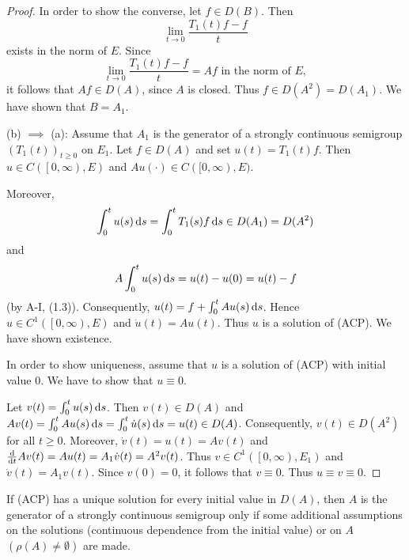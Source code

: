 \begin{proof}
In order to show the converse, let $f \in D(B)$.
Then 
\[ 
\lim_{t \to 0} \frac{T_{1}(t)f - f}{t}
\]
exists in the norm of $E$.
Since  
\[ 
\lim_{t \to 0} \frac{T_{1}(t)f - f}{t} = Af \text{ in the norm of } E,
\]
it follows that $Af \in D(A)$, since $A$ is closed.
Thus $f \in D(A^{2}) = D(A_{1})$.
We have shown that $B = A_{1}$.

(b)  $\implies$ (a):  
Assume that $A_{1}$ is the generator of a strongly continuous semigroup $(T_{1}(t))_{t \geq 0}$ on $E_{1}$.
Let $f \in D(A)$ and set $u(t) = T_{1}(t)f$.
Then $u \in C(\left[0,\infty\right),E)$ and $Au(\cdot) \in C([0,\infty),E)$.

Moreover, 
\[
\int_{0}^{t} u(s) \mathop{}\!\mathrm{d}{s} = \int_{0}^{t} T_{1}(s) f   \mathop{}\!\mathrm{d}{s} \in D(A_{1}) = D(A^{2})
\]
and 
\[
A\int_{0}^{t} u(s) \mathop{}\!\mathrm{d}{s} = u(t) - u(0) = u(t) - f
\]
(by A-I, (1.3)).
Consequently, $u(t) = f + \int_{0}^{t} Au(s) \mathop{}\!\mathrm{d}{s}$.
Hence $u \in C^{1}(\left[0,\infty  \right),E)$ and $\dot{u}(t) = Au(t)$.
Thus $u$ is a solution of (ACP).
We have shown existence.

In order to show uniqueness, assume that $u$ is a solution of (ACP) with initial value $0$.
We have to show that $u \equiv 0$.

Let $v(t) = \int_{0}^{t} u(s) \mathop{}\!\mathrm{d}{s}$.
Then $v(t) \in D(A)$ and $Av(t) = \int_{0}^{t} Au(s) \mathop{}\!\mathrm{d}{s} =
 \int_{0}^{t} \dot{u}(s) \mathop{}\!\mathrm{d}{s} = 
 u(t) \in D(A)$.
Consequently, $v(t) \in D(A^{2})$ for all $t \geq 0$.
Moreover, $\dot{v}(t) = u(t) = Av(t)$ and 
$\frac{\mathop{}\!\mathrm{d}{}}{\mathop{}\!\mathrm{d}{t}}Av(t) = Au(t) = A_{1}\dot{v}(t) = A^{2}v(t)$.
Thus $v \in C^{1}(\left[0,\infty \right),E_{1})$ and $\dot{v}(t) = A_{1}v(t)$.
Since $v(0) = 0$, it follows that $v \equiv 0$.
Thus $u \equiv v  \equiv 0$.
\end{proof}
If (ACP) has a unique solution for every initial value in $D(A)$, then $A$ is the generator of a strongly continuous semigroup only if some additional assumptions on the solutions (continuous dependence from the initial value) or on $A$ $(\rho(A) \neq \emptyset)$ are made.
